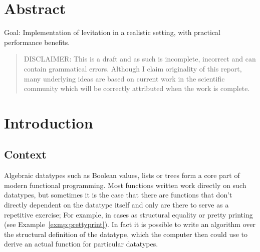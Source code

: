 \documentclass{ituthesis}
\theoremstyle{definition}
\begin{document}

\frontmatter

\thetitlepage
\newpage

\chapter*{Abstract}
Goal: Implementation of levitation in a realistic setting, with practical performance benefits.
\blockquote{DISCLAIMER: This is a draft and as such is incomplete, incorrect and can contain grammatical errors.
Although I claim originality of this report, many underlying ideas are based on current work in the scientific community which will be correctly attributed
when the work is complete.}

\cleardoublepage
\setcounter{tocdepth}{1}
\tableofcontents

\mainmatter

\midsloppy
\sloppybottom

\chapter{Introduction}
\label{cha:Intoduction}
\section{Context}
\label{sec:Context}
Algebraic datatypes such as Boolean values, lists or trees form a core part of modern functional programming.
Most functions written work directly on such datatypes, but sometimes it is the case that there are functions that don't directly dependent on the datatype itself and only are there to serve as a repetitive exercise; For example, in cases as structural equality or pretty printing (see Example~\ref{exmp:prettyprint}).
In fact it is possible to write an algorithm over the structural definition of the datatype, which the computer then could use to derive an actual function for particular datatypes.
\end{document}
